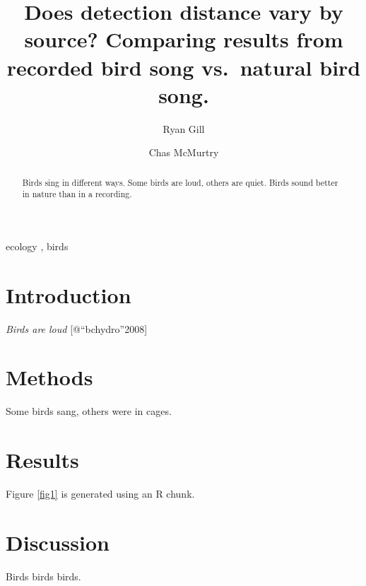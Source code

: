 \documentclass[preprint, 3p,
authoryear]{elsarticle} %
\begin{document}
\begin{frontmatter}

  \title{Does detection distance vary by source? Comparing results from
recorded bird song vs.~natural bird song.}
    \author[University of British Columbia]{Ryan Gill%
  }
    \author[Another University]{Chas McMurtry%
  }
  
  
  \begin{abstract}
  Birds sing in different ways. Some birds are loud, others are quiet.
  Birds sound better in nature than in a recording.
  \end{abstract}
    \begin{keyword}
    ecology \sep 
    birds
  \end{keyword}
  
 \end{frontmatter}

\hypertarget{introduction}{%
\section{Introduction}\label{introduction}}

\emph{Birds are loud} {[}@``bchydro''2008{]}

\hypertarget{methods}{%
\section{Methods}\label{methods}}

Some birds sang, others were in cages.

\hypertarget{results}{%
\section{Results}\label{results}}

Figure \ref{fig1} is generated using an R chunk.

\hypertarget{discussion}{%
\section{Discussion}\label{discussion}}

Birds birds birds\citep{2007for2008}.

\renewcommand\refname{References}

\end{document}
